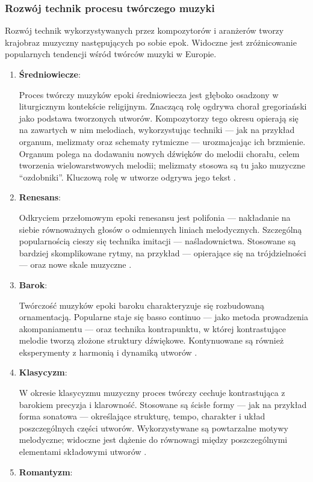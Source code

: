 \subsubsection{Rozwój technik procesu twórczego muzyki}
Rozwój technik wykorzystywanych przez kompozytorów i aranżerów tworzy krajobraz muzyczny następujących po sobie epok.
Widoczne jest zróżnicowanie popularnych tendencji wśród twórców muzyki w Europie.
\begin{enumerate}
	\item \textbf{Średniowiecze}:

	      Proces twórczy muzyków epoki średniowiecza jest głęboko osadzony w liturgicznym kontekście religijnym.
	      Znaczącą rolę ogdrywa chorał gregoriański jako podstawa tworzonych utworów.
	      Kompozytorzy tego okresu opierają się na zawartych w nim melodiach, wykorzystując techniki — jak na przykład organum,
	      melizmaty oraz schematy rytmiczne — urozmajcając ich brzmienie.
	      Organum polega na dodawaniu nowych dźwięków do melodii chorału, celem tworzenia wielowarstwowych melodii;
	      melizmaty stosowa są tu jako muzyczne \enquote{ozdobniki}. Kluczową rolę w utworze odgrywa jego tekst \cite{abc}.
	\item \textbf{Renesans}:

	      Odkryciem przełomowym epoki renesansu jest polifonia — nakładanie na siebie równoważnych głosów o
	      odmiennych liniach melodycznych.
	      Szczególną popularnością cieszy się technika imitacji — naśladownictwa.
	      Stosowane są bardziej skomplikowane rytmy, na przykład — opierające się na trójdzielności — oraz nowe
	      skale muzyczne \cite{atlas1}.
	\item \textbf{Barok}:

	      Twórczość muzyków epoki baroku charakteryzuje się rozbudowaną ornamentacją.
	      Popularne staje się basso continuo — jako metoda prowadzenia akompaniamentu — oraz technika kontrapunktu,
	      w której kontrastujące melodie tworzą złożone struktury dźwiękowe.
	      Kontynuowane są również eksperymenty z harmonią i dynamiką utworów \cite{estetyka}.
	\item \textbf{Klasycyzm}:

	      W okresie klasycyzmu muzyczny proces twórczy cechuje kontrastująca z barokiem precyzja i klarowność.
	      Stosowane są ścisłe formy — jak na przykład forma sonatowa — określające strukturę, tempo,
	      charakter i układ poszczególnych części utworów.
	      Wykorzystywane są powtarzalne motywy melodyczne;
	      widoczne jest dążenie do równowagi między poszczególnymi elementami składowymi utworów \cite{abc}.
	\item \textbf{Romantyzm}:


\end{enumerate}
